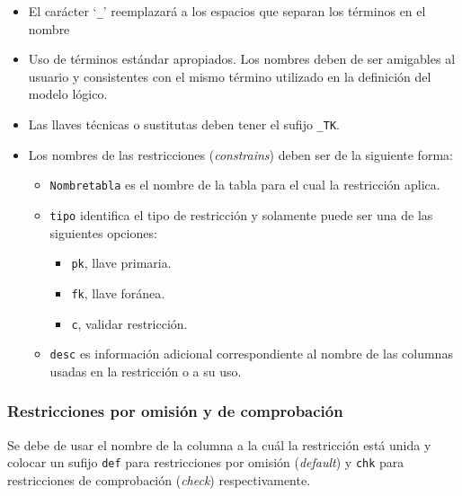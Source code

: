 \begin{itemize}

\item El carácter `\texttt{\_}' reemplazará a los espacios que separan los
  términos en el nombre

\item Uso de términos estándar apropiados. Los nombres deben de ser amigables al
  usuario y consistentes con el mismo término utilizado en la definición del
  modelo lógico.

\item Las llaves técnicas o sustitutas deben tener el sufijo \texttt{\_TK}.

\item Los nombres de las restricciones (\emph{constrains}) deben ser de la
  siguiente forma:

  \begin{itemize}

  \item \texttt{Nombretabla} es el nombre de la tabla para el cual la
    restricción aplica.

  \item \texttt{tipo} identifica el tipo de restricción y solamente puede ser
    una de las siguientes opciones:

    \begin{itemize}
    \item \texttt{pk}, llave primaria.
    \item \texttt{fk}, llave foránea.
    \item \texttt{c}, validar restricción.
    \end{itemize}

  \item \texttt{desc} es información adicional correspondiente al nombre de las
    columnas usadas en la restricción o a su uso.

  \end{itemize}

\end{itemize}

\subsubsection{Restricciones por omisión y de comprobación}

Se debe de usar el nombre de la columna a la cuál la restricción está unida y
colocar un sufijo \texttt{def} para restricciones por omisión (\emph{default}) y
\texttt{chk} para restricciones de comprobación (\emph{check}) respectivamente.

